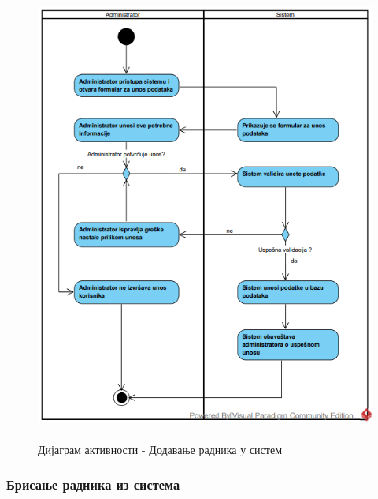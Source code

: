 \documentclass{article}
\begin{document}
\begin{figure}[H]
    \centering
    \includegraphics[width=1.1\textwidth, height=15cm]{Dijagrami_slike/dodavanje_radnika.png}
    \caption{Дијаграм активности - Додавање радника у систем}
\end{figure}

\newpage
\subsubsection{Брисање радника из система}
\end{document}
